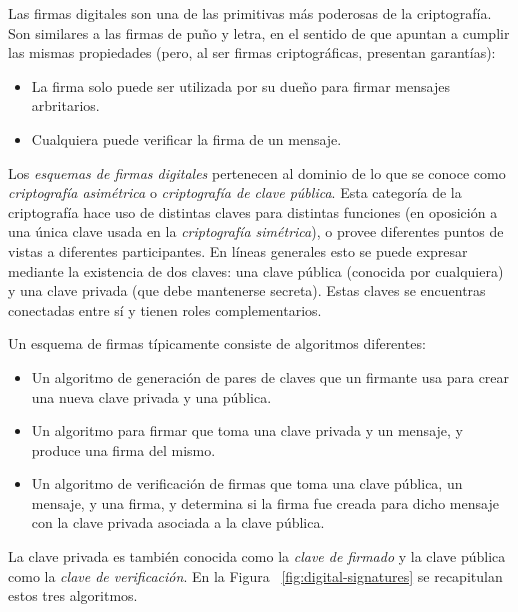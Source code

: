 %
Las firmas digitales son una de las primitivas más poderosas de la criptografía.
Son similares a las firmas de puño y letra, en el sentido de que apuntan a cumplir las mismas propiedades
(pero, al ser firmas criptográficas, presentan garantías):
\begin{itemize}
  \item La firma solo puede ser utilizada por su dueño para firmar mensajes arbritarios.
  \item Cualquiera puede verificar la firma de un mensaje.
\end{itemize}
 
Los \textit{esquemas de firmas digitales} pertenecen al dominio de lo que se conoce como \textit{criptografía asimétrica}
o \textit{criptografía de clave pública}.
%
Esta categoría de la criptografía hace uso de distintas claves para distintas funciones (en oposición a una única
clave usada en la \textit{criptografía simétrica}), o provee diferentes puntos de vistas a diferentes participantes.
%
En líneas generales esto se puede expresar mediante la existencia de dos claves: una clave pública (conocida por cualquiera)
y una clave privada (que debe mantenerse secreta). Estas claves se encuentras conectadas entre sí y tienen roles complementarios.


Un esquema de firmas típicamente consiste de algoritmos diferentes:
\begin{itemize}
  \item Un algoritmo de generación de pares de claves que un firmante usa para crear una nueva clave privada y una pública.
  \item Un algoritmo para firmar que toma una clave privada y un mensaje, y produce una firma del mismo.
  \item Un algoritmo de verificación de firmas que toma una clave pública, un mensaje, y una firma, y determina si la firma
  fue creada para dicho mensaje con la clave privada asociada a la clave pública. 
\end{itemize}

La clave privada es también conocida como la \textit{clave de firmado} y la clave pública como la \textit{clave de verificación}.
En la Figura ~\ref{fig:digital-signatures} se recapitulan estos tres algoritmos.

